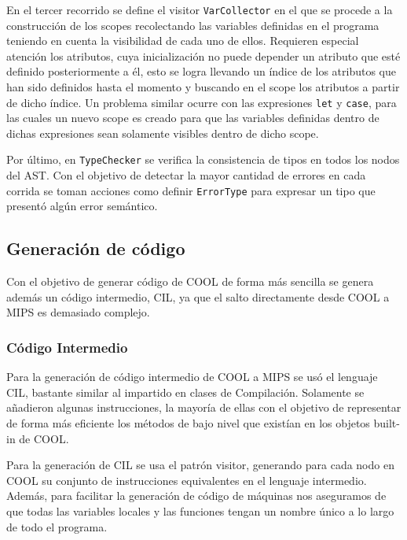 \documentclass[11pt]{scrartcl} %
\begin{document}
En el tercer recorrido se define el visitor \texttt{VarCollector} en el que se procede a la construcción de los scopes recolectando las variables definidas en el programa teniendo en cuenta la visibilidad de cada uno de ellos. Requieren especial atención los atributos, cuya inicialización no puede depender un atributo que esté definido posteriormente a él, esto se logra llevando un índice de los atributos que han sido definidos hasta el momento y buscando en el scope los atributos a partir de dicho índice. Un problema similar ocurre con las expresiones \texttt{let} y \texttt{case}, para las cuales un nuevo scope es creado para que las variables definidas dentro de dichas expresiones sean solamente visibles dentro de dicho scope.

Por último, en \texttt{TypeChecker} se verifica la consistencia de tipos en todos los nodos del AST. Con el objetivo de detectar la mayor cantidad de errores en cada corrida se toman acciones como definir \texttt{ErrorType} para expresar un tipo que presentó algún error semántico.

\subsection{Generación de código}

Con el objetivo de generar código de COOL de forma más sencilla se genera además un código intermedio, CIL, ya que el salto directamente desde COOL a MIPS es demasiado complejo.

\subsubsection{Código Intermedio}

Para la generación de código intermedio de COOL a MIPS se usó el lenguaje CIL, bastante similar al impartido en clases de Compilación. Solamente se añadieron algunas instrucciones, la mayoría de ellas con el objetivo de representar de forma más eficiente los métodos de bajo nivel que existían en los objetos built-in de COOL.

Para la generación de CIL se usa el patrón visitor, generando para cada nodo en COOL su conjunto de instrucciones equivalentes en el lenguaje intermedio. Además, para facilitar la generación de código de máquinas nos aseguramos de que todas las variables locales y las funciones tengan un nombre único a lo largo de todo el programa.
\end{document}
